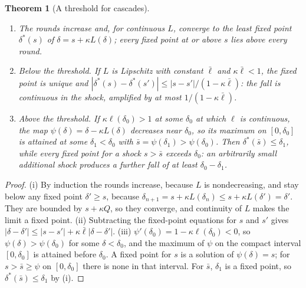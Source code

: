 \documentclass[12pt]{article}
\newtheorem{theorem}{Theorem}[section]
\theoremstyle{definition}
\theoremstyle{remark}
\begin{document}
\begin{theorem}[A threshold for cascades]\label{thm:cascade}
\begin{enumerate}[label=(\roman*),itemsep=1pt]
\item The rounds increase and, for continuous $L$, converge to the least fixed point $\delta^*(s)$ of $\delta=s+\kappa L(\delta)$; every fixed point at or above $s$ lies above every round.
\item \emph{Below the threshold.} If $L$ is Lipschitz with constant $\bar\ell$ and $\kappa\bar\ell<1$, the fixed point is unique and $|\delta^*(s)-\delta^*(s')|\le|s-s'|/(1-\kappa\bar\ell)$: the fall is continuous in the shock, amplified by at most $1/(1-\kappa\bar\ell)$.
\item \emph{Above the threshold.} If $\kappa\ell(\delta_0)>1$ at some $\delta_0$ at which $\ell$ is continuous, the map $\psi(\delta)=\delta-\kappa L(\delta)$ decreases near $\delta_0$, so its maximum on $[0,\delta_0]$ is attained at some $\delta_1<\delta_0$ with $\bar s=\psi(\delta_1)>\psi(\delta_0)$. Then $\delta^*(\bar s)\le\delta_1$, while every fixed point for a shock $s>\bar s$ exceeds $\delta_0$: an arbitrarily small additional shock produces a further fall of at least $\delta_0-\delta_1$.
\end{enumerate}
\end{theorem}

\begin{proof}
(i) By induction the rounds increase, because $L$ is nondecreasing, and stay below any fixed point $\delta'\ge s$, because $\delta_{n+1}=s+\kappa L(\delta_n)\le s+\kappa L(\delta')=\delta'$. They are bounded by $s+\kappa Q$, so they converge, and continuity of $L$ makes the limit a fixed point. (ii) Subtracting the fixed-point equations for $s$ and $s'$ gives $|\delta-\delta'|\le|s-s'|+\kappa\bar\ell|\delta-\delta'|$. (iii) $\psi'(\delta_0)=1-\kappa\ell(\delta_0)<0$, so $\psi(\delta)>\psi(\delta_0)$ for some $\delta<\delta_0$, and the maximum of $\psi$ on the compact interval $[0,\delta_0]$ is attained before $\delta_0$. A fixed point for $s$ is a solution of $\psi(\delta)=s$; for $s>\bar s\ge\psi$ on $[0,\delta_0]$ there is none in that interval. For $\bar s$, $\delta_1$ is a fixed point, so $\delta^*(\bar s)\le\delta_1$ by (i).
\end{proof}
\end{document}
